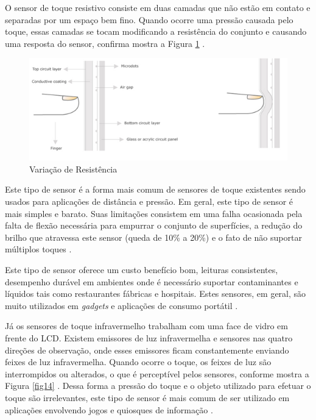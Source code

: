 \begin{anexosenv}
O sensor de toque resistivo consiste em duas camadas que não estão em contato e separadas por um espaço bem fino. Quando ocorre uma pressão causada pelo toque, essas camadas se tocam modificando a resistência do conjunto e causando uma resposta do sensor, confirma mostra a Figura \ref{fig13} \cite{keyur}.

\begin{figure}[htb]
		\centering
			\includegraphics[scale=0.7]{figuras/variacao.png}
		\caption{Variação de Resistência}
		\label{fig13}
\end{figure}

Este tipo de sensor é a forma mais comum de sensores de toque existentes sendo usados para aplicações de distância e pressão. Em geral, este tipo de sensor é mais simples e barato. Suas limitações consistem em uma falha ocasionada pela falta de flexão necessária para empurrar o conjunto de superfícies, a redução do brilho que atravessa este sensor (queda de 10\% a 20\%) e o fato de não suportar múltiplos toques \cite{mathas}.

Este tipo de sensor oferece um custo benefício bom, leituras consistentes, desempenho durável em ambientes onde é necessário suportar contaminantes e líquidos tais como restaurantes fábricas e hospitais. Estes sensores, em geral, são muito utilizados em \textit{gadgets} e aplicações de consumo portátil \cite{mathas}.



Já os sensores de toque infravermelho trabalham com uma face de vidro em frente do LCD. Existem emissores de luz infravermelha e sensores nas quatro direções de observação, onde esses emissores ficam constantemente enviando feixes de luz infravermelha. Quando ocorre o toque, os feixes de luz são interrompidos ou alterados, o que é perceptível pelos sensores, conforme mostra a Figura \ref{fig14} \cite{vicki}. Dessa forma a pressão do toque e o objeto utilizado para efetuar o toque são irrelevantes, este tipo de sensor é mais comum de ser utilizado em aplicações envolvendo jogos e quiosques de informação \cite{mathas}.



\end{anexosenv}
